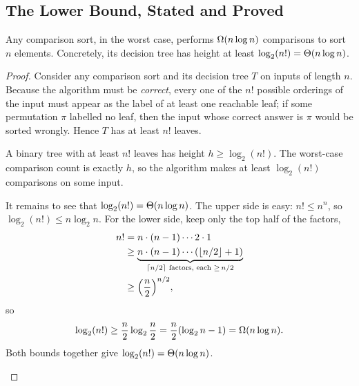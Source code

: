 \subsection{The Lower Bound, Stated and Proved}

\begin{theorem}
\label{ch08:lower-bound}
Any comparison sort, in the worst case, performs $\Omega(n \log n)$ comparisons to
sort $n$ elements. Concretely, its decision tree has height at least
$\log_2(n!) = \Theta(n \log n)$.
\end{theorem}

\begin{proof}
Consider any comparison sort and its decision tree $T$ on inputs of length $n$.
Because the algorithm must be \emph{correct}, every one of the $n!$ possible
orderings of the input must appear as the label of at least one reachable leaf;
if some permutation $\pi$ labelled no leaf, then the input whose correct answer
is $\pi$ would be sorted wrongly. Hence $T$ has at least $n!$ leaves.

A binary tree with at least $n!$ leaves has height
$h \ge \log_2(n!)$. The worst-case comparison count is exactly $h$, so the
algorithm makes at least $\log_2(n!)$ comparisons on some input.

It remains to see that $\log_2(n!) = \Theta(n\log n)$. The upper side is easy:
$n! \le n^n$, so $\log_2(n!) \le n \log_2 n$. For the lower side, keep only the
top half of the factors,
\begin{align*}
n! &= n\cdot(n-1)\cdots 2 \cdot 1 \\
   &\ge \underbrace{n\cdot(n-1)\cdots (\lfloor n/2\rfloor + 1)}_{\lceil n/2\rceil \text{ factors, each } \ge\, n/2} \\
   &\ge \Bigl(\frac{n}{2}\Bigr)^{n/2},
\end{align*}
so
\[
\log_2(n!) \ge \frac{n}{2}\log_2\frac{n}{2} = \frac{n}{2}(\log_2 n - 1) = \Omega(n\log n).
\]
Both bounds together give $\log_2(n!) = \Theta(n \log n)$.

\begin{figure}[H]
\centering
{}
\end{figure}
\end{proof}
